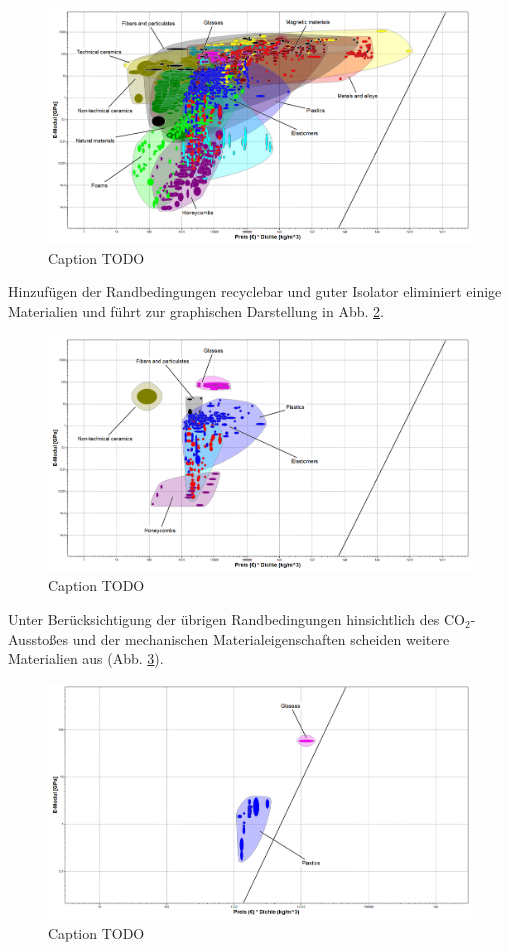 \begin{figure}[H]
	\centering
	\includegraphics[width=1.0\linewidth]{chapter/Bilder/3_1_1}
	\caption{Caption TODO}
		\label{fig:ces_3_1_1}
\end{figure}
Hinzufügen der Randbedingungen \glqq recyclebar\grqq{} und \glqq guter Isolator\grqq{} eliminiert einige Materialien und führt zur graphischen Darstellung in Abb. \ref{fig:ces_3_1_2}.\\
\begin{figure}[H]
	\centering
	\includegraphics[width=1.0\linewidth]{chapter/Bilder/3_1_2}
	\caption{Caption TODO}
	\label{fig:ces_3_1_2}
\end{figure}
Unter Berücksichtigung der übrigen Randbedingungen hinsichtlich des CO$_2$-Ausstoßes und der mechanischen Materialeigenschaften scheiden weitere Materialien aus (Abb. \ref{fig:ces_3_1_3}).\\
\begin{figure}[H]
	\centering
	\includegraphics[width=1.0\linewidth]{chapter/Bilder/3_1_3}
	\caption{Caption TODO}
	\label{fig:ces_3_1_3}
\end{figure}
